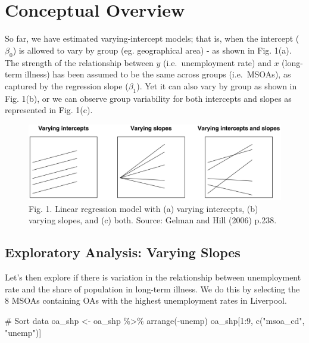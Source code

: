 \documentclass[
  letterpaper,
  DIV=11,
  numbers=noendperiod,
  oneside]{scrreprt}
\newenvironment{Shaded}{\begin{snugshade}}{\end{snugshade}}
\newcommand{\CommentTok}[1]{\textcolor[rgb]{0.37,0.37,0.37}{#1}}
\newcommand{\DecValTok}[1]{\textcolor[rgb]{0.68,0.00,0.00}{#1}}
\newcommand{\FunctionTok}[1]{\textcolor[rgb]{0.28,0.35,0.67}{#1}}
\newcommand{\NormalTok}[1]{\textcolor[rgb]{0.00,0.23,0.31}{#1}}
\newcommand{\OtherTok}[1]{\textcolor[rgb]{0.00,0.23,0.31}{#1}}
\newcommand{\SpecialCharTok}[1]{\textcolor[rgb]{0.37,0.37,0.37}{#1}}
\newcommand{\StringTok}[1]{\textcolor[rgb]{0.13,0.47,0.30}{#1}}
\begin{document}
\section{Conceptual Overview}\label{conceptual-overview}

So far, we have estimated varying-intercept models; that is, when the
intercept (\(\beta_{0}\)) is allowed to vary by group (eg. geographical
area) - as shown in Fig. 1(a). The strength of the relationship between
\(y\) (i.e.~unemployment rate) and \(x\) (long-term illness) has been
assumed to be the same across groups (i.e.~MSOAs), as captured by the
regression slope (\(\beta_{1}\)). Yet it can also vary by group as shown
in Fig. 1(b), or we can observe group variability for both intercepts
and slopes as represented in Fig. 1(c).

\begin{figure}[H]

{\centering \includegraphics{figs/ch6/fig11.1_Gelman_Hill.png}

}

\caption{Fig. 1. Linear regression model with (a) varying intercepts,
(b) varying slopes, and (c) both. Source: Gelman and Hill (2006) p.238.}

\end{figure}%

\subsection{Exploratory Analysis: Varying
Slopes}\label{exploratory-analysis-varying-slopes}

Let's then explore if there is variation in the relationship between
unemployment rate and the share of population in long-term illness. We
do this by selecting the 8 MSOAs containing OAs with the highest
unemployment rates in Liverpool.

\begin{Shaded}
\begin{Highlighting}[]
\CommentTok{\# Sort data }
\NormalTok{oa\_shp }\OtherTok{\textless{}{-}}\NormalTok{ oa\_shp }\SpecialCharTok{\%\textgreater{}\%} \FunctionTok{arrange}\NormalTok{(}\SpecialCharTok{{-}}\NormalTok{unemp)}
\NormalTok{oa\_shp[}\DecValTok{1}\SpecialCharTok{:}\DecValTok{9}\NormalTok{, }\FunctionTok{c}\NormalTok{(}\StringTok{"msoa\_cd"}\NormalTok{, }\StringTok{"unemp"}\NormalTok{)]}
\end{Highlighting}
\end{Shaded}
\end{document}
